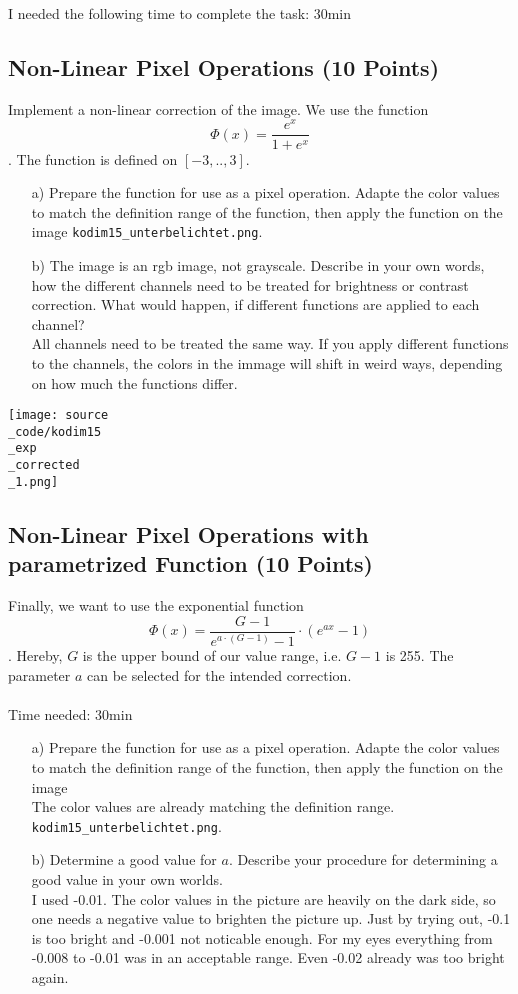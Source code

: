 I needed the following time to complete the task: 30min

\subsection{Non-Linear Pixel Operations (10 Points)}

Implement a non-linear correction of the image. We use the function $$ \Phi(x) = \frac{e^x}{1+e^x}$$. The function is defined on $[-3,..,3]$. 

\begin{enumerate}
\item[a)] Prepare the function for use as a pixel operation. Adapte the color values to match the definition range of the function, then apply the function on the image \texttt{kodim15\_unterbelichtet.png}.
\item[b)] The image is an rgb image, not grayscale. Describe in your own words, how the different channels need to be treated for brightness or contrast correction. What would happen,
if different functions are applied to each channel?\\
All channels need to be treated the same way. If you apply different functions to the channels, the colors in the immage will shift in weird ways, depending on how much the functions differ.
\end{enumerate}

\texttt{[image: source\\\_code/kodim15\\\_exp\\\_corrected\\\_1.png]}

\subsection{Non-Linear Pixel Operations with parametrized Function (10 Points)}

Finally, we want to use the exponential function $$ \Phi(x) = \frac{G-1}{e^{a \cdot (G-1)} - 1} \cdot (e^{ax} - 1)$$. Hereby, $G$ is the upper bound of our value range, i.e. $G-1$ is 255. The
parameter $a$ can be selected for the intended correction.\\
\\
Time needed: 30min

\begin{enumerate}
\item[a)] Prepare the function for use as a pixel operation. Adapte the color values to match the definition range of the function, then apply the function on the image\\
The color values are already matching the definition range.
\texttt{kodim15\_unterbelichtet.png}.
\item[b)] Determine a good value for $a$. Describe your procedure for determining a good value in your own worlds.\\
I used -0.01. The color values in the picture are heavily on the dark side, so one needs a negative value to brighten the picture up. Just by trying out, -0.1 is too bright and -0.001 not noticable enough. For my eyes everything from -0.008 to -0.01 was in an acceptable range. Even -0.02 already was too bright again.
\end{enumerate}

